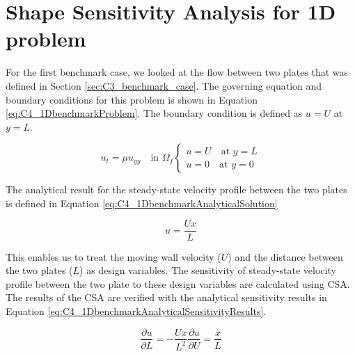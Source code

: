 \section{Shape Sensitivity Analysis for 1D problem}
For the first benchmark case, we looked at the flow between two plates that was defined in Section \ref{sec:C3_benchmark_case}. The governing equation and boundary conditions for this problem is shown in Equation \eqref{eq:C4_1DbenchmarkProblem}. The boundary condition is defined as $u = U$ at $y = L$.

\begin{subequations}\label{eq:C4_1DbenchmarkProblem}
\begin{equation}\label{eq:C4_1DbenchmarkGoverningEquation}
    u_t = \mu u_{yy} \quad \text{in } \Omega_f
\end{equation}
\begin{equation}\label{eq:C4_1DbenchmarkBoundaryCondition}
\begin{cases}
    u = U \quad \text{at } y = L \\
    u = 0 \quad \text{at } y = 0
\end{cases}
\end{equation}
\end{subequations}

The analytical result for the steady-state velocity profile between the two plates is defined in Equation \eqref{eq:C4_1DbenchmarkAnalyticalSolution}

\begin{equation}\label{eq:C4_1DbenchmarkAnalyticalSolution}
	u = \frac{Ux}{L}
\end{equation}

This enables us to treat the moving wall velocity ($U$) and the distance between the two plates ($L$) as design variables. The sensitivity of steady-state velocity profile between the two plate to these design variables are calculated using CSA. The results of the CSA are verified with the analytical sensitivity results in Equation \eqref{eq:C4_1DbenchmarkAnalyticalSensitivityResults}.

\begin{subequations}\label{eq:C4_1DbenchmarkAnalyticalSensitivityResults}
\begin{equation}\label{eq:C4_1DbenchmarkAnalyticalSAlength}
	\frac{\partial u}{\partial L} = -\frac{Ux}{L^2}
\end{equation}
\begin{equation}\label{eq:C4_1DbenchmarkAnalyticalSAvelocity}
	\frac{\partial u}{\partial U} = \frac{x}{L}
\end{equation}
\end{subequations}


